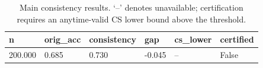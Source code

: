 \begin{table}[t]
\centering
\begin{tabular}{llllll}
\toprule
n & orig_acc & consistency & gap & cs_lower & certified \\
\midrule
200.000 & 0.685 & 0.730 & -0.045 & -- & False \\
\bottomrule
\end{tabular}
\caption{Main consistency results. `--' denotes unavailable; certification requires an anytime-valid CS lower bound above the threshold.}
\end{table}
